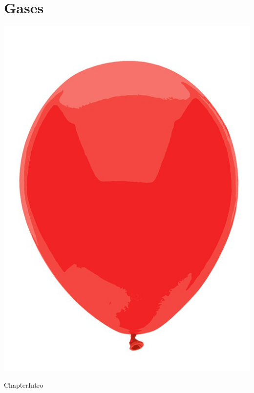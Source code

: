 \documentclass[main.tex]{subfiles}
\begin{document}
\chapter[Gases  ]{Gases }

\begin{marginfigure}\includegraphics{../Ch-Gas/figure1} \end{marginfigure}{ChapterIntro}
\end{document}

